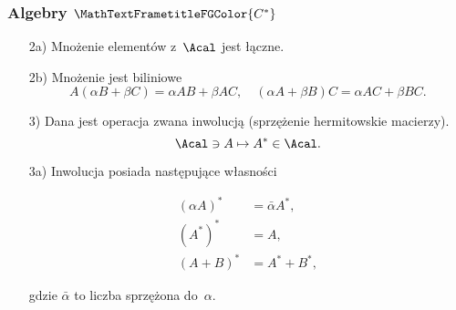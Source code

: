 \documentclass[10pt,t]{beamer}
\begin{document}
\begin{frame}
  \frametitle{Algebry $\MathTextFrametitleFGColor{C^{ * }}$}


  \begin{itemize}

  \item[2a)] Mnożenie elementów z~$\Acal$ jest łączne.

  \item[2b)] Mnożenie jest biliniowe
    \begin{equation}
      \label{eq:Niespodziewane-teoretyczne-01}
      A ( \alpha B + \beta C ) = \alpha A B + \beta A C, \quad
      ( \alpha A + \beta B ) C = \alpha A C + \beta B C.
    \end{equation}

    \vspace{-1.5em}



  \item[3)] Dana jest operacja zwana inwolucją (sprzężenie hermitowskie
    macierzy).
    \begin{equation}
      \label{eq:Niespodziewane-teoretyczne-01}
      \Acal \ni A \mapsto A^{ * } \in \Acal.
    \end{equation}

    \vspace{-1.5em}



  \item[3a)] Inwolucja posiada następujące własności

    \vspace{-2em}



    \begin{subequations}

      \begin{align}
        \label{eq:Niespodziewane-teoretyczne-01}
        ( \alpha A )^{ * } &= \bar{ \alpha } A^{ * }, \\
        ( A^{ * } )^{ * } &= A, \\
        ( A + B )^{ * } &= A^{ * } + B^{ * },
      \end{align}

    \end{subequations}

    \vspace{-2em}



    gdzie $\bar{ \alpha }$ to liczba sprzężona do~$\alpha$.

  \end{itemize}

\end{frame}
\end{document}

